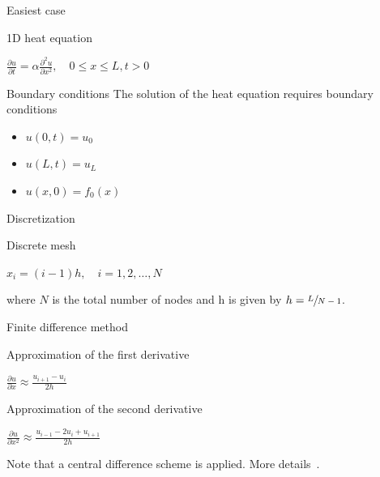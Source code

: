 \documentclass[12pt,t]{beamer}
\begin{document}
\begin{frame}{Easiest case}


\begin{block}{1D heat equation}
\begin{center}
$ \frac{\partial u}{\partial t} = \alpha \frac{\partial^2 u}{\partial x^2}, \quad 0 \leq x \leq L, t >0 $
\end{center}
\end{block}

\begin{block}{Boundary conditions}
The solution of the heat equation requires boundary conditions
\begin{itemize}
\item $u(0,t) = u_0$
\item $u(L,t) = u_L$
\item $u(x,0) = f_0(x)$
\end{itemize}
\end{block}

\end{frame}

\begin{frame}{Discretization}

\begin{center}
\end{center}

\begin{block}{Discrete mesh}
\begin{center}
$x_i = (i-1) h, \quad i=1,2,\ldots,N$ 
\end{center}
where $N$ is the total number of nodes and h is given by $h=\sfrac{L}{N-1}$.
\end{block}

\end{frame}

\begin{frame}{Finite difference method}

\begin{block}{Approximation of the first derivative}
\begin{center}
$ \frac{\partial u}{\partial x} \approx \frac{u_{i+1}-u_{i}}{2h}$
\end{center}
\end{block}

\begin{block}{Approximation of the second derivative}
\begin{center}
$ \frac{\partial u}{\partial x^2} \approx \frac{u_{i-1}-2u_{i}+u_{i+1}}{2h}$
\end{center}
\end{block}
Note that a central difference scheme is applied. More details~\cite{strikwerda2004finite,leveque2007finite}.
\end{frame}
\end{document}
